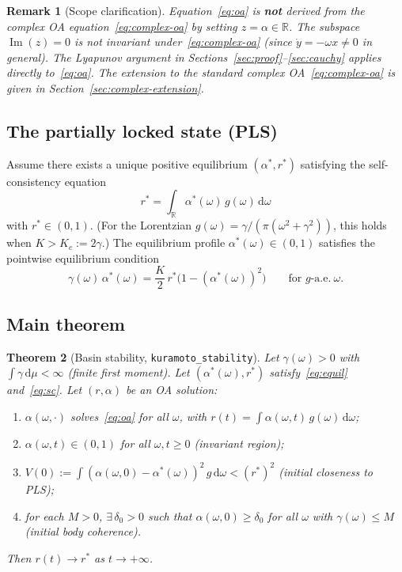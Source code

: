 \documentclass[11pt,a4paper]{article}
\newtheorem{theorem}{Theorem}[section]
\newtheorem{remark}[theorem]{Remark}
\theoremstyle{definition}
\DeclareMathOperator{\im}{Im}
\newcommand{\R}{\mathbb{R}}
\begin{document}
\begin{remark}[Scope clarification]\label{rem:scope}
Equation~\eqref{eq:oa} is \textbf{not} derived from the complex OA equation~\eqref{eq:complex-oa} by setting $z = \alpha \in \R$. The subspace $\im(z) = 0$ is not invariant under~\eqref{eq:complex-oa} (since $\dot{y} = -\omega x \neq 0$ in general). The Lyapunov argument in Sections~\ref{sec:proof}--\ref{sec:cauchy} applies directly to~\eqref{eq:oa}. The extension to the standard complex OA~\eqref{eq:complex-oa} is given in Section~\ref{sec:complex-extension}.
\end{remark}

\subsection{The partially locked state (PLS)}

Assume there exists a unique positive equilibrium $(\alpha^*, r^*)$ satisfying the self-consistency equation
\begin{equation}\label{eq:sc}
r^* = \int_\R \alpha^*(\omega)\,g(\omega)\,\mathrm{d}\omega
\end{equation}
with $r^* \in (0,1)$. (For the Lorentzian $g(\omega) = \gamma/(\pi(\omega^2+\gamma^2))$, this holds when $K > K_c := 2\gamma$.) The equilibrium profile $\alpha^*(\omega) \in (0,1)$ satisfies the pointwise equilibrium condition
\begin{equation}\label{eq:equil}
\gamma(\omega)\,\alpha^*(\omega) = \frac{K}{2}\,r^*\bigl(1 - (\alpha^*(\omega))^2\bigr) \qquad \text{for $g$-a.e.}\ \omega.
\end{equation}

\subsection{Main theorem}

\begin{theorem}[Basin stability, \texttt{kuramoto\_stability}]\label{thm:main}
Let $\gamma(\omega) > 0$ with $\int \gamma\,\mathrm{d}\mu < \infty$ (finite first moment). Let $(\alpha^*(\omega), r^*)$ satisfy~\eqref{eq:equil} and~\eqref{eq:sc}. Let $(r, \alpha)$ be an OA solution:
\begin{enumerate}[label=(\roman*)]
\item $\alpha(\omega,\cdot)$ solves~\eqref{eq:oa} for all $\omega$, with $r(t) = \int \alpha(\omega,t)\,g(\omega)\,\mathrm{d}\omega$;
\item $\alpha(\omega,t) \in (0,1)$ for all $\omega, t \geq 0$ (invariant region);
\item $V(0) := \int (\alpha(\omega,0) - \alpha^*(\omega))^2\,g\,\mathrm{d}\omega < (r^*)^2$ (initial closeness to PLS);
\item for each $M > 0$, $\exists\,\delta_0 > 0$ such that $\alpha(\omega,0) \geq \delta_0$ for all $\omega$ with $\gamma(\omega) \leq M$ (initial body coherence).
\end{enumerate}
Then $r(t) \to r^*$ as $t \to +\infty$.
\end{theorem}
\end{document}
